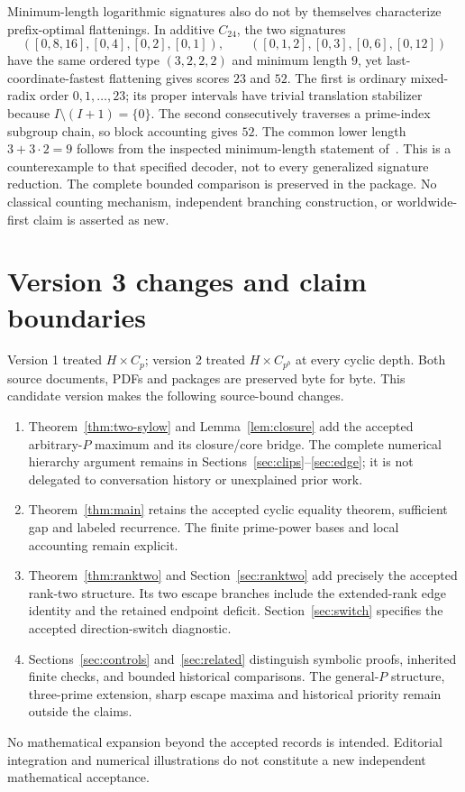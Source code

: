 \documentclass[11pt,letterpaper]{article}
\theoremstyle{definition}\newtheorem{definition}{Definition}
\begin{document}
Minimum-length logarithmic signatures also do not by themselves characterize prefix-optimal flattenings. In additive $C_{24}$, the two signatures
\[
([0,8,16],[0,4],[0,2],[0,1]),\qquad
([0,1,2],[0,3],[0,6],[0,12])
\]
have the same ordered type $(3,2,2,2)$ and minimum length $9$, yet last-coordinate-fastest flattening gives scores $23$ and $52$. The first is ordinary mixed-radix order $0,1,\ldots,23$; its proper intervals have trivial translation stabilizer because $I\setminus(I+1)=\{0\}$. The second consecutively traverses a prime-index subgroup chain, so block accounting gives $52$. The common lower length $3+3\cdot2=9$ follows from the inspected minimum-length statement of~\cite{gvs}. This is a counterexample to that specified decoder, not to every generalized signature reduction. The complete bounded comparison is preserved in the package. No classical counting mechanism, independent branching construction, or worldwide-first claim is asserted as new.

\appendix
\section{Version 3 changes and claim boundaries}\label{app:changes}
Version 1 treated $H\times C_p$; version 2 treated $H\times C_{p^b}$ at every cyclic depth. Both source documents, PDFs and packages are preserved byte for byte. This candidate version makes the following source-bound changes.
\begin{enumerate}
\item Theorem~\ref{thm:two-sylow} and Lemma~\ref{lem:closure} add the accepted arbitrary-$P$ maximum and its closure/core bridge. The complete numerical hierarchy argument remains in Sections~\ref{sec:clips}--\ref{sec:edge}; it is not delegated to conversation history or unexplained prior work.
\item Theorem~\ref{thm:main} retains the accepted cyclic equality theorem, sufficient gap and labeled recurrence. The finite prime-power bases and local accounting remain explicit.
\item Theorem~\ref{thm:ranktwo} and Section~\ref{sec:ranktwo} add precisely the accepted rank-two structure. Its two escape branches include the extended-rank edge identity and the retained endpoint deficit. Section~\ref{sec:switch} specifies the accepted direction-switch diagnostic.
\item Sections~\ref{sec:controls} and~\ref{sec:related} distinguish symbolic proofs, inherited finite checks, and bounded historical comparisons. The general-$P$ structure, three-prime extension, sharp escape maxima and historical priority remain outside the claims.
\end{enumerate}
No mathematical expansion beyond the accepted records is intended. Editorial integration and numerical illustrations do not constitute a new independent mathematical acceptance.
\end{document}
